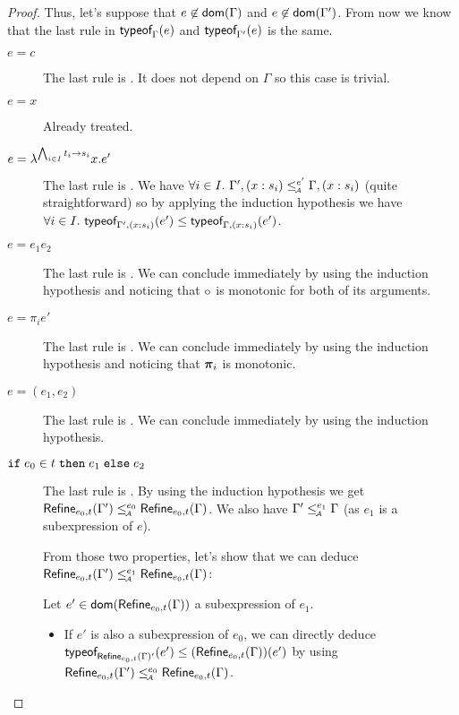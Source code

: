 \documentclass[a4paper]{article}
\theoremstyle{definition}
\begin{document}
\begin{proof}
  Thus, let's suppose that $e\not\in\dom\Gamma$ and $e\not\in\dom{\Gamma'}$.
  From now we know that the last rule in $\tyof e {\Gamma}$ and $\tyof e {\Gamma'}$ is the same.

  \begin{description}
    \item[$e=c$] The last rule is . It does not depend on $\Gamma$ so this case is trivial.
    \item[$e=x$] Already treated.
    \item[$e=\lambda^{\bigwedge_{i\in I} \arrow {t_i}{s_i}}x.e'$]
    The last rule is .
    We have $\forall i\in I.\ \Gamma', (x:s_i) \leqA^{e'} \Gamma, (x:s_i)$ (quite straightforward)
    so by applying the induction hypothesis we have $\forall i\in I.\ \tyof {e'} {\Gamma', (x:s_i)} \leq \tyof {e'} {\Gamma, (x:s_i)}$.

    \item[$e=e_1 e_2$] The last rule is .
    We can conclude immediately by using the induction hypothesis and noticing that $\apply {} {}$ is monotonic for both of its arguments.

    \item[$e=\pi_i e'$] The last rule is .
    We can conclude immediately by using the induction hypothesis and noticing that $\bpi_i$ is monotonic.
     
    \item[$e=(e_1,e_2)$] The last rule is .
    We can conclude immediately by using the induction hypothesis.

    \item[$\ite {e_0} t {e_1} {e_2}$] The last rule is .
    By using the induction hypothesis we get $\Refine {e_0,t} {\Gamma'} \leqA^{e_0} \Refine {e_0,t} \Gamma$.
    We also have $\Gamma' \leqA^{e_1} \Gamma$ (as $e_1$ is a subexpression of $e$).

    From those two properties, let's show that we can deduce $\Refine {e_0,t} {\Gamma'} \leqA^{e_1} \Refine {e_0,t} \Gamma$:

    Let $e'\in\dom{\Refine {e_0,t} \Gamma}$ a subexpression of $e_1$.
    \begin{itemize}
      \item If $e'$ is also a subexpression of $e_0$, we can directly deduce
      $\tyof {e'} {\Refine {e_0,t} \Gamma'} \leq (\Refine {e_0,t} \Gamma) (e')$
      by using $\Refine {e_0,t} {\Gamma'} \leqA^{e_0} \Refine {e_0,t} \Gamma$.


\end{itemize}
\end{description}
\end{proof}
\end{document}
